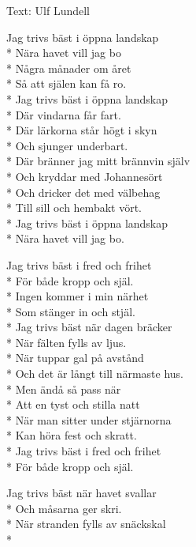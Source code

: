\begin{SongText}
\begin{SongInfo}
    Text: Ulf Lundell
\end{SongInfo}
\begin{SongVerse}
Jag trivs bäst i öppna landskap\\*%
Nära havet vill jag bo\\*%
Några månader om året\\*%
Så att själen kan få ro.\\*%
Jag trivs bäst i öppna landskap\\*%
Där vindarna får fart.\\*%
Där lärkorna står högt i skyn\\*%
Och sjunger underbart.\\*%
Där bränner jag mitt brännvin själv\\*%
Och kryddar med Johannesört\\*%
Och dricker det med välbehag\\*%
Till sill och hembakt vört.\\*%
Jag trivs bäst i öppna landskap\\*%
Nära havet vill jag bo. 
\end{SongVerse}
\begin{SongVerse}
Jag trivs bäst i fred och frihet\\*%
För både kropp och själ.\\*%
Ingen kommer i min närhet\\*%
Som stänger in och stjäl.\\*%
Jag trivs bäst när dagen bräcker\\*%
När fälten fylls av ljus.\\*%
När tuppar gal på avstånd\\*%
Och det är långt till närmaste hus.\\*%
Men ändå så pass när\\*%
Att en tyst och stilla natt\\*%
När man sitter under stjärnorna\\*%
Kan höra fest och skratt.\\*%
Jag trivs bäst i fred och frihet\\*%
För både kropp och själ. 
\end{SongVerse}
\begin{SongVerse}
Jag trivs bäst när havet svallar\\*%
Och måsarna ger skri.\\*%
När stranden fylls av snäckskal\\*%

\end{SongVerse}
\end{SongText}
